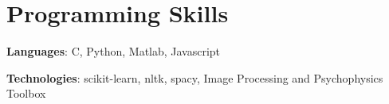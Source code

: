 \documentclass[letterpaper,11pt]{article}
\newcommand{\resumeSubHeadingListStart}{\begin{itemize}[leftmargin=*]}
\newcommand{\resumeSubHeadingListEnd}{\end{itemize}}
\begin{document}


%
\section{Programming Skills}
 
      \textbf{Languages}{: C, Python, Matlab, Javascript}
   

\textbf{Technologies}{: scikit-learn, nltk, spacy, Image Processing and Psychophysics Toolbox}
 


\end{document}
